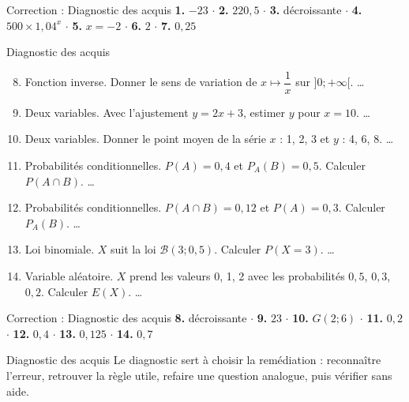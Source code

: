 \documentclass[aspectratio=169,10pt]{beamer}
\begin{document}
\begin{frame}{Correction : Diagnostic des acquis}
\textbf{1.} \(-23\) \ensuremath{\cdot} \textbf{2.} \(220{,}5\) \ensuremath{\cdot} \textbf{3.} décroissante \ensuremath{\cdot} \textbf{4.} \(500\times1{,}04^x\) \ensuremath{\cdot} \textbf{5.} \(x=-2\) \ensuremath{\cdot} \textbf{6.} \(2\) \ensuremath{\cdot} \textbf{7.} \(0{,}25\)
\end{frame}
\begin{frame}{Diagnostic des acquis}
\begin{enumerate}
\setcounter{enumi}{7}\item Fonction inverse. Donner le sens de variation de \(x\mapsto\dfrac1x\) sur \(]0;+\infty[\). \ldots{}

\item Deux variables. Avec l'ajustement \(y=2x+3\), estimer \(y\) pour \(x=10\). \ldots{}

\item Deux variables. Donner le point moyen de la série \(x\) : 1, 2, 3 et \(y\) : 4, 6, 8. \ldots{}

\item Probabilités conditionnelles. \(P(A)=0{,}4\) et \(P_A(B)=0{,}5\). Calculer \(P(A\cap B)\). \ldots{}

\item Probabilités conditionnelles. \(P(A\cap B)=0{,}12\) et \(P(A)=0{,}3\). Calculer \(P_A(B)\). \ldots{}

\item Loi binomiale. \(X\) suit la loi \(\mathcal B(3;0{,}5)\). Calculer \(P(X=3)\). \ldots{}

\item Variable aléatoire. \(X\) prend les valeurs 0, 1, 2 avec les probabilités \(0{,}5\), \(0{,}3\), \(0{,}2\). Calculer \(E(X)\). \ldots{}

\end{enumerate}
\end{frame}
\begin{frame}{Correction : Diagnostic des acquis}
\textbf{8.} décroissante \ensuremath{\cdot} \textbf{9.} \(23\) \ensuremath{\cdot} \textbf{10.} \(G(2;6)\) \ensuremath{\cdot} \textbf{11.} \(0{,}2\) \ensuremath{\cdot} \textbf{12.} \(0{,}4\) \ensuremath{\cdot} \textbf{13.} \(0{,}125\) \ensuremath{\cdot} \textbf{14.} \(0{,}7\)
\end{frame}
\begin{frame}{Diagnostic des acquis}
Le diagnostic sert à choisir la remédiation : reconnaître l'erreur, retrouver la règle utile, refaire une question analogue, puis vérifier sans aide.
\end{frame}
\end{document}

